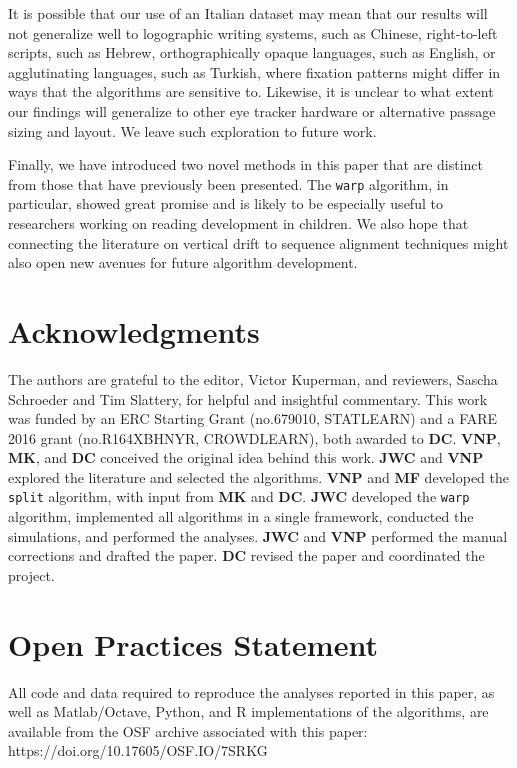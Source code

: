 \documentclass[doc,biblatex]{apa7}
\begin{document}
It is possible that our use of an Italian dataset may mean that our results will not generalize well to logographic writing systems, such as Chinese, right-to-left scripts, such as Hebrew, orthographically opaque languages, such as English, or agglutinating languages, such as Turkish, where fixation patterns might differ in ways that the algorithms are sensitive to. Likewise, it is unclear to what extent our findings will generalize to other eye tracker hardware or alternative passage sizing and layout. We leave such exploration to future work.

Finally, we have introduced two novel methods in this paper that are distinct from those that have previously been presented. The \texttt{warp} algorithm, in particular, showed great promise and is likely to be especially useful to researchers working on reading development in children. We also hope that connecting the literature on vertical drift to sequence alignment techniques might also open new avenues for future algorithm development.

\section{Acknowledgments}

The authors are grateful to the editor, Victor Kuperman, and reviewers, Sascha Schroeder and Tim Slattery, for helpful and insightful commentary. This work was funded by an ERC Starting Grant (no.\@ 679010, STATLEARN) and a FARE 2016 grant (no.\@ R164XBHNYR, CROWDLEARN), both awarded to \textbf{DC}. \textbf{VNP}, \textbf{MK}, and \textbf{DC} conceived the original idea behind this work. \textbf{JWC} and \textbf{VNP} explored the literature and selected the algorithms. \textbf{VNP} and \textbf{MF} developed the \texttt{split} algorithm, with input from \textbf{MK} and \textbf{DC}. \textbf{JWC} developed the \texttt{warp} algorithm, implemented all algorithms in a single framework, conducted the simulations, and performed the analyses. \textbf{JWC} and \textbf{VNP} performed the manual corrections and drafted the paper. \textbf{DC} revised the paper and coordinated the project.

\section{Open Practices Statement}

All code and data required to reproduce the analyses reported in this paper, as well as Matlab/Octave, Python, and R implementations of the algorithms, are available from the OSF archive associated with this paper: https://doi.org/10.17605/OSF.IO/7SRKG

\printbibliography
\end{document}
